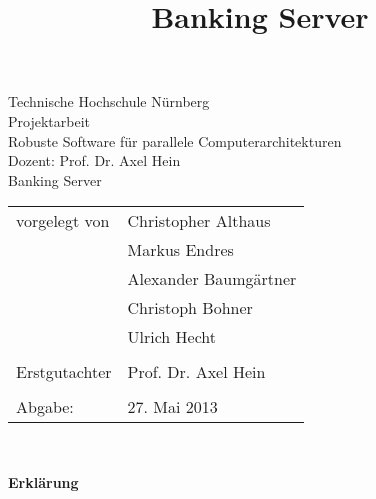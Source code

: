\documentclass[10pt,a4paper]{article}
\title{Banking Server}
\begin{document}
\begin{titlepage}
\vspace*{1cm}
\begin{center}
\Huge
Technische Hochschule Nürnberg\\
\vspace*{2cm}
\large
Projektarbeit\\ Robuste Software für parallele Computerarchitekturen\\
Dozent: Prof. Dr. Axel Hein\\
\vspace*{2cm}
\Huge
Banking Server\\
\vspace{1cm}
\large
\vspace{2cm}

 \begin{tabular}{p{6 cm}p{6 cm}}
    	vorgelegt von & {Christopher Althaus} \\
		& {Markus Endres} \\
		& {Alexander Baumgärtner} \\
		& {Christoph Bohner} \\
		& {Ulrich Hecht} \\ & \\
    	Erstgutachter & {Prof. Dr. Axel Hein}\\ & \\
    	Abgabe:& 27. Mai 2013
 \end{tabular}\\
    


\end{center}
\end{titlepage}

\clearpage\thispagestyle{empty}
\begin{center}\textbf{\large Erklärung}\end{center}
\end{document}

